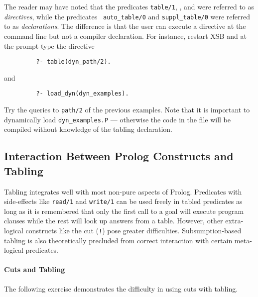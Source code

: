 \begin{exercise}
The reader may have noted that the predicates {\tt table/1},
, and 
were referred to as \emph{directives}, while the predicates {\tt
auto\_table/0} and {\tt suppl\_table/0} were referred to as
\emph{declarations}.  The difference is that the user can execute a
directive at the command line but not a compiler declaration.  For
instance, restart XSB and at the prompt type the directive
\begin{verbatim}
         ?- table(dyn_path/2).
\end{verbatim}
and 
\begin{verbatim}
         ?- load_dyn(dyn_examples).
\end{verbatim}
Try the queries to {\tt path/2} of the previous examples.  Note that
it is important to dynamically load {\tt dyn\_examples.P} ---
otherwise the code in the file will be compiled without knowledge of
the tabling declaration.\fillBox
\end{exercise}


\subsection{Interaction Between Prolog Constructs and Tabling}

Tabling integrates well with most non-pure aspects of Prolog.
Predicates with side-effects like {\tt read/1} and {\tt write/1} can
be used freely in tabled predicates as long as it is remembered that
only the first call to a goal will execute program clauses while the
rest will look up answers from a table.  However, other extra-logical
constructs like the cut (\texttt{!}) pose greater difficulties.
Subsumption-based tabling is also theoretically precluded from correct
interaction with certain meta-logical predicates.


\paragraph{Cuts and Tabling} \label{sec:cuts}

The following exercise demonstrates the difficulty in using cuts with
tabling.

